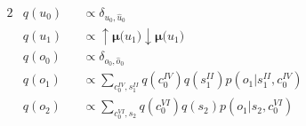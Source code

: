 \documentclass[fleqn]{article}
\begin{document}
\begin{minipage}[t]{0.5\textwidth}
\begin{alignat}{2}
         & q(u_0)                                                           &  & \propto \delta_{u_0,\hat{u}_0}                                                                                                                                                                      \\
         & q(u_1)                                                           &  & \propto \bm{{\uparrow}{\mu}(}u_1\bm{)} \bm{{\downarrow}{\mu}(}u_1\bm{)}                                                                                                                             \\
         & q(o_0)                                                           &  & \propto \delta_{o_0,\hat{o}_0}                                                                                                                                                                      \\
         & q(o_1)                                                           &  & \propto \sum_{c^{\scriptscriptstyle IV}_0,s^{\scriptscriptstyle II}_1} q(c^{\scriptscriptstyle IV}_0) q(s^{\scriptscriptstyle II}_1) p(o_1|s^{\scriptscriptstyle II}_1,c^{\scriptscriptstyle IV}_0) \\
         & q(o_2)                                                           &  & \propto \sum_{c^{\scriptscriptstyle VI}_0,s_2} q(c^{\scriptscriptstyle VI}_0) q(s_2) p(o_1|s_2,c^{\scriptscriptstyle VI}_0)
    \end{alignat}
\end{minipage}
\end{document}
